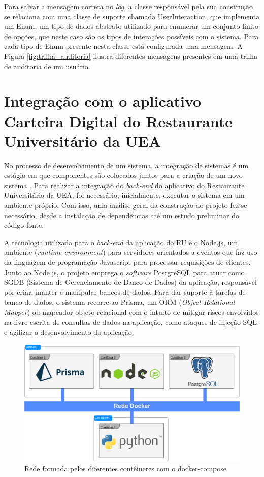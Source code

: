 Para salvar a mensagem correta no \emph{log}, a classe responsável pela sua construção se relaciona com uma classe de suporte chamada UserInteraction, que implementa um Enum, um tipo de dados abstrato utilizado para enumerar um conjunto finito de opções, que neste caso são os tipos de interações possíveis com o sistema. Para cada tipo de Enum presente nesta classe está configurada uma mensagem. A Figura \ref{fig:trilha_auditoria} ilustra diferentes mensagens presentes em uma trilha de auditoria de um usuário.


\section{Integração com o aplicativo Carteira Digital do Restaurante Universitário da UEA}
No processo de desenvolvimento de um sistema, a integração de sistemas é um estágio em que componentes são colocados juntos para a criação de um novo sistema \cite{Sommerville2011}. Para realizar a integração do \emph{back-end} do aplicativo do Restaurante Universitário da UEA, foi necessário, inicialmente, executar o sistema em um ambiente próprio. Com isso, uma análise geral da construção do projeto fez-se necessário, desde a instalação de dependências até um estudo preliminar do código-fonte.

A tecnologia utilizada para o \emph{back-end} da aplicação do RU é o Node.js, um ambiente (\emph{runtime environment}) para servidores orientados a eventos que faz uso da linguagem de programação Javascript para processar requisições de clientes. Junto ao Node.js, o projeto emprega o \emph{software} PostgreSQL para atuar como SGDB (Sistema de Gerenciamento de Banco de Dados) da aplicação, responsável por criar, manter e manipular bancos de dados. Para dar suporte à tarefas de banco de dados, o sistema recorre ao Prisma, um ORM (\emph{Object-Relational Mapper}) ou mapeador objeto-relacional com o intuito de mitigar riscos envolvidos na livre escrita de consultas de dados na aplicação, como ataques de injeção SQL e agilizar o desenvolvimento da aplicação.

\begin{figure}
    \centering
    \includegraphics[width=1\textwidth]{img/Cap3/Rede Docker.png}
    \caption{Rede formada pelos diferentes contêineres com o docker-compose}
    \label{fig:rede_docker}
\end{figure}


